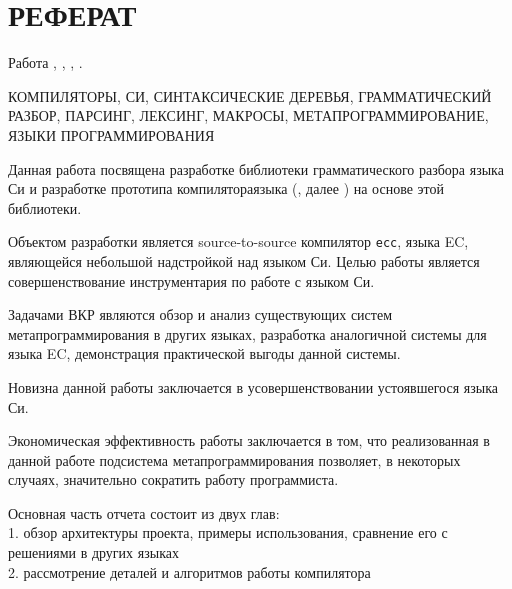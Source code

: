 \chapter*{РЕФЕРАТ}

\begin{center}
Работа , 
    ,
    ,
    .
\end{center}

    КОМПИЛЯТОРЫ, СИ, СИНТАКСИЧЕСКИЕ ДЕРЕВЬЯ, ГРАММАТИЧЕСКИЙ РАЗБОР, ПАРСИНГ, ЛЕКСИНГ, МАКРОСЫ, МЕТАПРОГРАММИРОВАНИЕ, ЯЗЫКИ ПРОГРАММИРОВАНИЯ %

    \vspace{5mm}
Данная работа посвящена разработке библиотеки грамматического разбора языка Си и разработке прототипа компилятора\break языка  (, далее ) на основе этой библиотеки.

Объектом разработки является source-to-source компилятор \verb|ecc|, языка EC, являющейся небольшой надстройкой над языком Си.
Целью работы является совершенствование инструментария по работе с языком Си.

Задачами ВКР являются обзор и анализ существующих систем метапрограммирования в других языках, 
разработка аналогичной системы для языка EC,
демонстрация практической выгоды данной системы.

Новизна данной работы заключается в усовершенствовании устоявшегося языка Си.

Экономическая эффективность работы заключается в том, что реализованная в данной работе подсистема метапрограммирования позволяет, в некоторых случаях, значительно сократить работу программиста. %

Основная часть отчета состоит из двух глав:\\
1. обзор архитектуры проекта, примеры использования, сравнение его с решениями в других языках\\
2. рассмотрение деталей и алгоритмов работы компилятора

